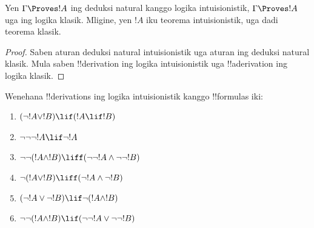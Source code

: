 \documentclass[../../../include/open-logic-section]{subfiles}
\begin{document}
\begin{prop}
  Yen $\Gamma \Proves !A$ ing deduksi natural kanggo logika
  intuisionistik, $\Gamma \Proves !A$ uga ing logika klasik.
  Mligine, yen $!A$ iku teorema intuisionistik, uga dadi teorema klasik.
\end{prop}

\begin{proof}
  Saben aturan deduksi natural intuisionistik uga aturan ing deduksi
  natural klasik. Mula saben !!{derivation} ing logika intuisionistik
  uga !!a{derivation} ing logika klasik.
\end{proof}

\begin{prob}
  Wenehana !!{derivation}s ing logika intuisionistik kanggo !!{formula}s iki:
  \begin{enumerate}
    \item $(\lnot !A \lor !B) \lif (!A \lif !B)$
    \item $\lnot\lnot\lnot !A \lif \lnot !A$
    \item $\lnot\lnot (!A \land !B) \liff (\lnot\lnot !A\land \lnot \lnot !B)$
    \item $\lnot (!A \lor !B) \liff (\lnot !A \land \lnot !B)$
    \item $(\lnot !A \lor \lnot !B) \lif \lnot (!A \land !B)$
    \item $\lnot\lnot ( !A \land !B) \lif  (\lnot\lnot !A \lor
    \lnot\lnot !B)$
  \end{enumerate}
\end{prob}
\end{document}
